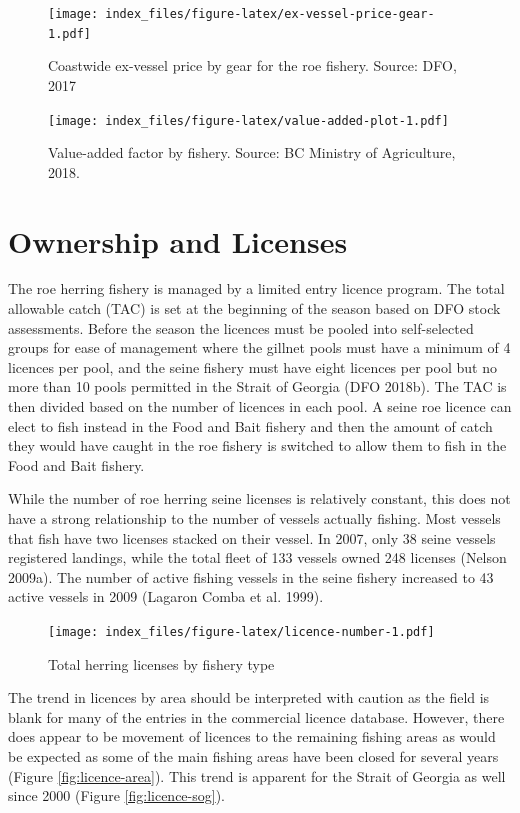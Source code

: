 \documentclass[]{article}
\theoremstyle{definition}
\theoremstyle{definition}
\theoremstyle{definition}
\theoremstyle{remark}
\begin{document}
\begin{figure}
\centering
\texttt{[image: index\_files/figure-latex/ex-vessel-price-gear-1.pdf]}
\caption{\label{fig:ex-vessel-price-gear}Coastwide ex-vessel price by gear
for the roe fishery. Source: DFO, 2017}
\end{figure}

\begin{figure}
\centering
\texttt{[image: index\_files/figure-latex/value-added-plot-1.pdf]}
\caption{\label{fig:value-added-plot}Value-added factor by fishery. Source:
BC Ministry of Agriculture, 2018.}
\end{figure}

\section{Ownership and Licenses}\label{ownership-and-licenses}

The roe herring fishery is managed by a limited entry licence program.
The total allowable catch (TAC) is set at the beginning of the season
based on DFO stock assessments. Before the season the licences must be
pooled into self-selected groups for ease of management where the
gillnet pools must have a minimum of 4 licences per pool, and the seine
fishery must have eight licences per pool but no more than 10 pools
permitted in the Strait of Georgia (DFO 2018b). The TAC is then divided
based on the number of licences in each pool. A seine roe licence can
elect to fish instead in the Food and Bait fishery and then the amount
of catch they would have caught in the roe fishery is switched to allow
them to fish in the Food and Bait fishery.

While the number of roe herring seine licenses is relatively constant,
this does not have a strong relationship to the number of vessels
actually fishing. Most vessels that fish have two licenses stacked on
their vessel. In 2007, only 38 seine vessels registered landings, while
the total fleet of 133 vessels owned 248 licenses (Nelson 2009a). The
number of active fishing vessels in the seine fishery increased to 43
active vessels in 2009 (Lagaron Comba et al. 1999).

\begin{figure}
\centering
\texttt{[image: index\_files/figure-latex/licence-number-1.pdf]}
\caption{\label{fig:licence-number}Total herring licenses by fishery type}
\end{figure}

The trend in licences by area should be interpreted with caution as the
field is blank for many of the entries in the commercial licence
database. However, there does appear to be movement of licences to the
remaining fishing areas as would be expected as some of the main fishing
areas have been closed for several years (Figure
\ref{fig:licence-area}). This trend is apparent for the Strait of
Georgia as well since 2000 (Figure \ref{fig:licence-sog}).
\end{document}
